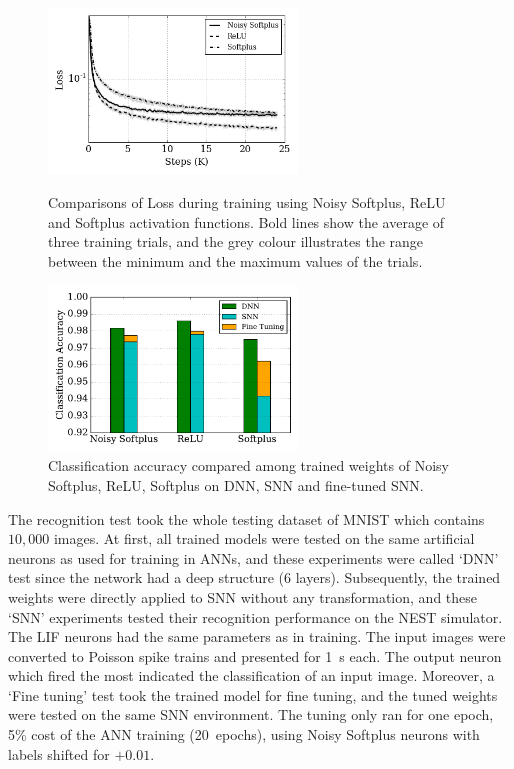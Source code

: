 \documentclass{article}
\begin{document}
\begin{figure}
	\begin{minipage}[t]{0.48\linewidth}
		\raggedleft
		\includegraphics[width=2.6in]{pics_iconip/8.png}
		\caption{Comparisons of Loss during training using Noisy Softplus, ReLU and Softplus activation functions. Bold lines show the average of three training trials, and the grey colour illustrates the range between the minimum and the maximum values of the trials. }
		\label{Fig:loss_ns}
	\end{minipage}%
    \hspace{0.04\linewidth}
	\begin{minipage}[t]{0.48\linewidth}
		\raggedright
		\includegraphics[width=2.6in]{pics_iconip/9-2.pdf}
		\caption{Classification accuracy compared among trained weights of Noisy Softplus, ReLU, Softplus on DNN, SNN and fine-tuned SNN.}
		\label{Fig:result_bar}
	\end{minipage}
\end{figure}

The recognition test took the whole testing dataset of MNIST which contains $10,000$ images.
At first, all trained models were tested on the same artificial neurons as used for training in ANNs, and these experiments were called `DNN' test since the network had a deep structure (6 layers).
Subsequently, the trained weights were directly applied to SNN without any transformation, and these `SNN' experiments tested their recognition performance on the NEST simulator.
The LIF neurons had the same parameters as in training.
The input images were converted to Poisson spike trains and presented for 1~s each.
The output neuron which fired the most indicated the classification of an input image.
Moreover, a `Fine tuning' test took the trained model for fine tuning, and the tuned weights were tested on the same SNN environment.
The tuning only ran for one epoch, 5\% cost of the ANN training (20~epochs), using Noisy Softplus neurons with labels shifted for $+0.01$.
\end{document}
